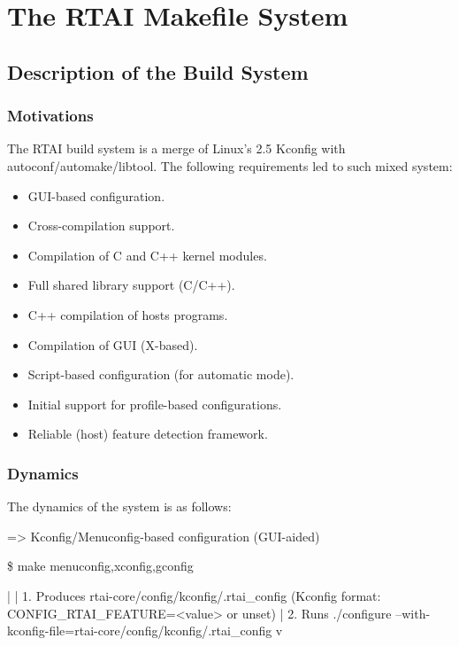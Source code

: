 \chapter{The RTAI Makefile System}


\section{Description of the Build System}

\subsection{Motivations}

The RTAI build system is a merge of Linux's 2.5 Kconfig with
autoconf/automake/libtool. The following requirements led to such
mixed system:

\begin{itemize}
\item GUI-based configuration.
\item Cross-compilation support.
\item Compilation of C and C++ kernel modules.
\item Full shared library support (C/C++).
\item C++ compilation of hosts programs.
\item Compilation of GUI (X-based).
\item Script-based configuration (for automatic mode).
\item Initial support for profile-based configurations.
\item Reliable (host) feature detection framework.
\end{itemize}


\subsection{Dynamics}

The dynamics of the system is as follows:

=> Kconfig/Menuconfig-based configuration (GUI-aided)

  \$ make menuconfig,xconfig,gconfig

         |
         | 1. Produces rtai-core/config/kconfig/.rtai\_config
	      (Kconfig format: CONFIG\_RTAI\_FEATURE=<value> or unset)
         | 2. Runs ./configure --with-kconfig-file=rtai-core/config/kconfig/.rtai\_config
         v

